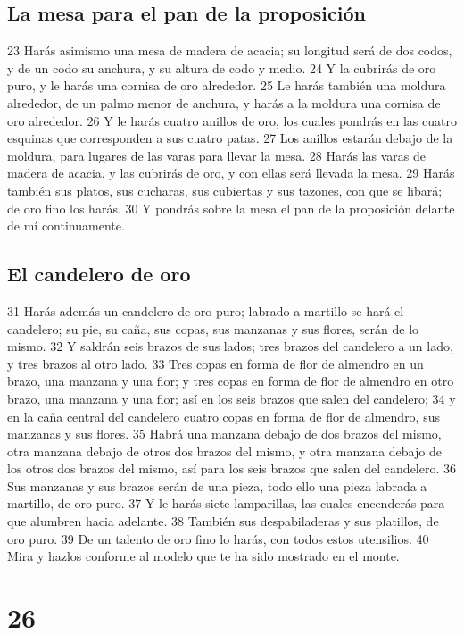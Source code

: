 \section{La mesa para el pan de la proposición}

23 Harás asimismo una mesa de madera de acacia; su longitud será de dos codos,   y de un codo su anchura, y su altura de codo y medio.
24 Y la cubrirás de oro puro, y le harás una cornisa de oro alrededor.
25 Le harás también una moldura alrededor, de un palmo menor   de anchura, y harás a la moldura una cornisa de oro alrededor.
26 Y le harás cuatro anillos de oro, los cuales pondrás en las cuatro esquinas que corresponden a sus cuatro patas.
27 Los anillos estarán debajo de la moldura, para lugares de las varas para llevar la mesa.
28 Harás las varas de madera de acacia, y las cubrirás de oro, y con ellas será llevada la mesa.
29 Harás también sus platos, sus cucharas, sus cubiertas y sus tazones, con que se libará; de oro fino los harás.
30 Y pondrás sobre la mesa el pan de la proposición delante de mí continuamente.

\section{El candelero de oro}

31 Harás además un candelero de oro puro; labrado a martillo se hará el candelero; su pie, su caña, sus copas, sus manzanas y sus flores, serán de lo mismo.
32 Y saldrán seis brazos de sus lados; tres brazos del candelero a un lado, y tres brazos al otro lado.
33 Tres copas en forma de flor de almendro en un brazo, una manzana y una flor; y tres copas en forma de flor de almendro en otro brazo, una manzana y una flor; así en los seis brazos que salen del candelero;
34 y en la caña central del candelero cuatro copas en forma de flor de almendro, sus manzanas y sus flores.
35 Habrá una manzana debajo de dos brazos del mismo, otra manzana debajo de otros dos brazos del mismo, y otra manzana debajo de los otros dos brazos del mismo, así para los seis brazos que salen del candelero.
36 Sus manzanas y sus brazos serán de una pieza, todo ello una pieza labrada a martillo, de oro puro.
37 Y le harás siete lamparillas, las cuales encenderás para que alumbren hacia adelante.
38 También sus despabiladeras y sus platillos, de oro puro.
39 De un talento de oro   fino lo harás, con todos estos utensilios.
40 Mira y hazlos conforme al modelo que te ha sido mostrado en el monte.

\chapter{26}

